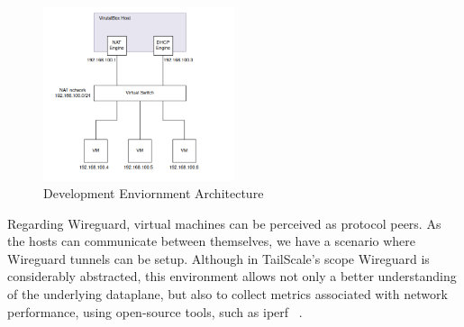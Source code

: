 \documentclass[11pt,twoside,a4paper]{report}
\begin{document}
\begin{figure}[h]
\centering
\includegraphics[width=0.5\textwidth]{dev.png}
\caption{Development Enviornment Architecture}
\label{fig:sandbox}
\end{figure}

Regarding Wireguard, virtual machines can be perceived as protocol peers. As the hosts can communicate between themselves, we have a scenario where Wireguard tunnels can be setup. Although in TailScale's scope Wireguard is considerably abstracted, this environment allows not only a better understanding of the underlying dataplane, but also to collect metrics associated with network performance, using open-source tools, such as iperf ~\cite{iperfws}.


%
%
\cleardoublepage
\iffalse
\else






\cleardoublepage
\end{document}
